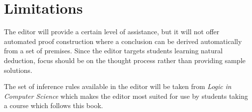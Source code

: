 \section{Limitations}

The editor will provide a certain level of assistance, but it will not offer automated proof construction where a conclusion can be derived automatically from a set of premises. Since the editor targets students learning natural deduction, focus should be on the thought process rather than providing sample solutions.

The set of inference rules available in the editor will be taken from \emph{Logic in Computer Science} \cite{huth_ryan_2018} which makes the editor most suited for use by students taking a course which follows this book.